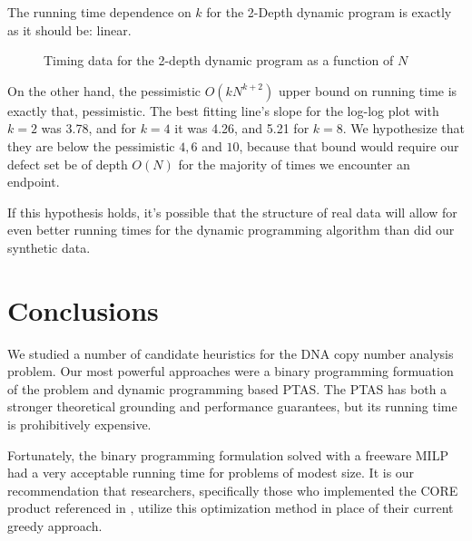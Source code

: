The running time dependence on $k$ for the 2-Depth dynamic program is exactly as it should be: linear.

\begin{figure}[ht!] \centering
  \caption{Timing data for the 2-depth dynamic program as a function of $N$}
\end{figure}

On the other hand, the pessimistic $O(kN^{k+2})$ upper bound on running time is exactly that, pessimistic. The best fitting line's slope for the log-log plot with $k=2$ was 3.78, and for $k=4$ it was 4.26, and 5.21 for $k=8$. We hypothesize that they are below the pessimistic $4, 6$ and $10$, because that bound would require our defect set be of depth $O(N)$ for the majority of times we encounter an endpoint. 

If this hypothesis holds, it's possible that the structure of real data will allow for even better running times for the dynamic programming algorithm than did our synthetic data.

\FloatBarrier
\section{Conclusions}

We studied a number of candidate heuristics for the DNA copy number analysis problem.  Our most powerful approaches were a binary programming formuation of the problem and dynamic programming based PTAS. The PTAS has both a stronger theoretical grounding and performance guarantees, but its running time is prohibitively expensive.

Fortunately, the binary programming formulation solved with a freeware MILP had a very acceptable running time for problems of modest size.  It is our recommendation that researchers, specifically those who implemented the CORE product referenced in \cite{krasnitz2013target}, utilize this optimization method in place of their current greedy approach.

